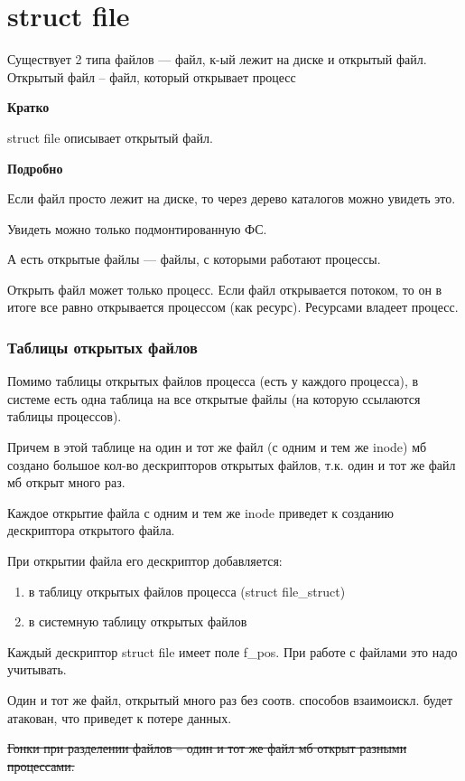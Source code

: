 \section{struct file}

Существует 2 типа файлов --- файл, к-ый лежит на диске и открытый файл. Открытый файл -- файл, который открывает процесс

\textbf{Кратко}

struct file описывает открытый файл.

\textbf{Подробно}

Если файл просто лежит на диске, то через дерево каталогов можно увидеть это. 

Увидеть можно только подмонтированную ФС.

А есть открытые файлы --- файлы, с которыми работают процессы.

Открыть файл может только процесс. Если файл открывается потоком, то он в итоге все равно открывается процессом (как ресурс). Ресурсами владеет процесс.


\subsubsection{Таблицы открытых файлов}

Помимо таблицы открытых файлов процесса (есть у каждого процесса), в системе есть одна таблица на все открытые файлы (на которую ссылаются таблицы процессов).

Причем в этой таблице на один и тот же файл (с одним и тем же inode) мб создано большое кол-во дескрипторов открытых файлов, т.к. один и тот же файл мб открыт много раз. 

Каждое открытие файла с одним и тем же inode приведет к созданию дескриптора открытого файла.

При открытии файла его дескриптор добавляется:
\begin{enumerate}
    \item в таблицу открытых файлов процесса (struct file\_struct)
    \item в системную таблицу открытых файлов
\end{enumerate}

Каждый дескриптор struct file имеет поле f\_pos. При работе с файлами это надо учитывать.

Один и тот же файл, открытый много раз без соотв. способов взаимоискл. будет атакован, что приведет к потере данных.

\sout{Гонки при разделении файлов -- один и тот же файл мб открыт разными процессами.}

